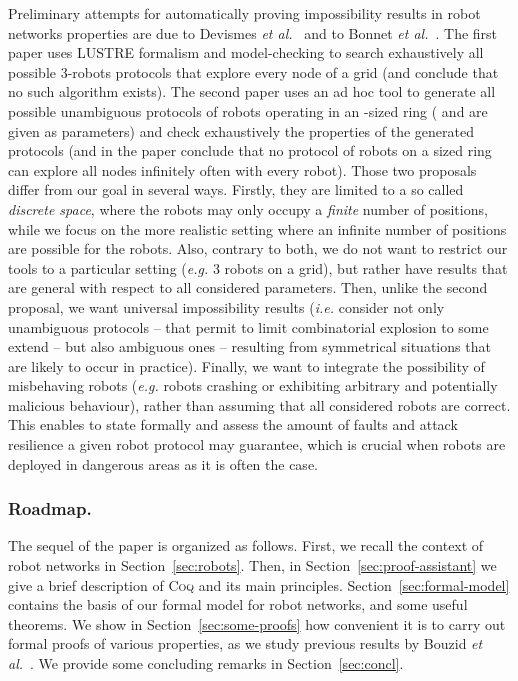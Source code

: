 \documentclass[11pt,a4]{llncs}
\newcommand{\x}{\xspace}
\newcommand{\coq}{\textsc{Coq}\x}
\begin{document}
Preliminary attempts for automatically proving impossibility results
in robot networks properties are due to Devismes \emph{et
  al.}~\cite{devismes12sss} and to Bonnet \emph{et
  al.}~\cite{bonnet12sss}. The first paper uses LUSTRE formalism and
model-checking to search exhaustively all possible 3-robots protocols
that explore every node of a  grid (and conclude that no
such algorithm exists). The second paper uses an ad hoc tool to
generate all possible unambiguous protocols of  robots operating in
an -sized ring ( and  are given as parameters) and
check exhaustively the properties of the generated protocols (and in
the paper conclude that no protocol of  robots on a  sized ring
can explore all nodes infinitely often with every robot). Those two
proposals differ from our goal in several ways. Firstly, they are limited
to a so called \emph{discrete space}, where the robots may only occupy
a \emph{finite} number of positions, while we focus on the more
realistic setting where an infinite number of positions are possible
for the robots. Also, contrary to both, we do not want to restrict our
tools to a particular setting (\emph{e.g.} 3 robots on a 
grid), but rather have results that are general with respect to all
considered parameters. Then, unlike the second proposal, we want
universal impossibility results (\emph{i.e.} consider not only
unambiguous protocols -- that permit to limit combinatorial explosion
to some extend -- but also ambiguous ones -- resulting from
symmetrical situations that are likely to occur in practice). Finally,
we want to integrate the possibility of misbehaving robots
(\emph{e.g.} robots crashing or exhibiting arbitrary and potentially
malicious behaviour), rather than assuming that all considered robots
are correct. This enables to state formally and assess the amount of
faults and attack resilience a given robot protocol may guarantee,
which is crucial when robots are deployed in dangerous areas as it is
often the case.

\subsubsection*{Roadmap.} 
The sequel of the paper is organized as follows.
First, we recall the context of robot networks in Section~\ref{sec:robots}. Then, in Section~\ref{sec:proof-assistant} we give a brief
description of \coq and its main principles. Section~\ref{sec:formal-model} contains the basis of our formal model
for robot networks, and some useful theorems. We show in Section~\ref{sec:some-proofs} how convenient it is to carry
out formal proofs of various properties, as we study previous results by
Bouzid \emph{et al.}~\cite{bouzid10tcs}. We provide some concluding remarks in Section~\ref{sec:concl}. 
\end{document}
